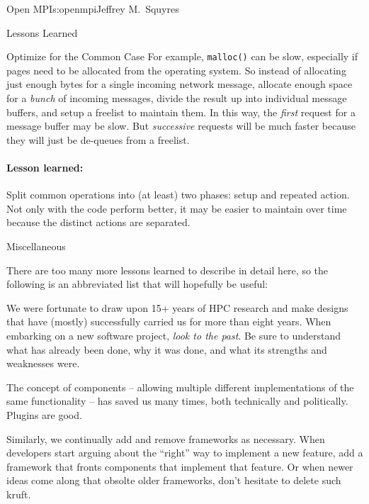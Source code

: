 \begin{aosachapter}{Open MPI}{s:openmpi}{Jeffrey M.\ Squyres}
\begin{aosasect1}{Lessons Learned}
\begin{aosasect2}{Optimize for the Common Case}
For example, {\tt malloc()} can be slow, especially if pages need to
be allocated from the operating system.  So instead of allocating just
enough bytes for a single incoming network message, allocate enough
space for a {\em bunch} of incoming messages, divide the result up
into individual message buffers, and setup a freelist to maintain
them.  In this way, the {\em first} request for a message buffer may
be slow.  But {\em successive} requests will be much faster because
they will just be de-queues from a freelist.


\paragraph{Lesson learned:} Split common operations into (at least)
two phases: setup and repeated action.  Not only with the code perform
better, it may be easier to maintain over time because the distinct
actions are separated.

\end{aosasect2}


\begin{aosasect2}{Miscellaneous}

There are too many more lessons learned to describe in detail here,
so the following is an abbreviated list that will hopefully be useful:

\begin{aosaitemize}
\item We were fortunate to draw upon 15+ years of HPC research and
  make designs that have (mostly) successfully carried us for more
  than eight years.  When embarking on a new software project, {\em
    look to the past}.  Be sure to understand what has already been
  done, why it was done, and what its strengths and weaknesses were.

\item The concept of components -- allowing multiple different
  implementations of the same functionality -- has saved us many
  times, both technically and politically.  Plugins are good.

\item Similarly, we continually add and remove frameworks as
  necessary.  When developers start arguing about the ``right'' way to
  implement a new feature, add a framework that fronts components that
  implement that feature.  Or when newer ideas come along that obsolte
  older frameworks, don't hesitate to delete such kruft.


\end{aosaitemize}
\end{aosasect2}
\end{aosasect1}
\end{aosachapter}

